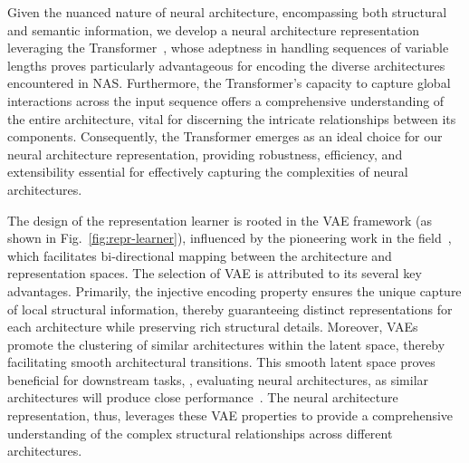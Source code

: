 \documentclass[../main.tex]{subfiles}
\begin{document}
Given the nuanced nature of neural architecture, encompassing both structural and semantic information, we develop a neural architecture representation leveraging the Transformer~\cite{DBLP:conf/nips/VaswaniSPUJGKP17,DBLP:conf/cvpr/YiZH0023}, whose adeptness in handling sequences of variable lengths proves particularly advantageous for encoding the diverse architectures encountered in NAS\@.
Furthermore, the Transformer's capacity to capture global interactions across the input sequence offers a comprehensive understanding of the entire architecture, vital for discerning the intricate relationships between its components.
Consequently, the Transformer emerges as an ideal choice for our neural architecture representation, providing robustness, efficiency, and extensibility essential for effectively capturing the complexities of neural architectures.

The design of the representation learner is rooted in the VAE framework (as shown in Fig.~\ref{fig:repr-learner}), influenced by the pioneering work in the field~\cite{DBLP:conf/nips/YanZAZ020,DBLP:conf/ijcnn/LukasikFZHK21}, which facilitates bi-directional mapping between the architecture and representation spaces.
The selection of VAE is attributed to its several key advantages.
Primarily, the injective encoding property ensures the unique capture of local structural information, thereby guaranteeing distinct representations for each architecture while preserving rich structural details.
Moreover, VAEs promote the clustering of similar architectures within the latent space, thereby facilitating smooth architectural transitions.
This smooth latent space proves beneficial for downstream tasks, \eg, evaluating neural architectures, as similar architectures will produce close performance~\cite{Liu2020ASO}.
The neural architecture representation, thus, leverages these VAE properties to provide a comprehensive understanding of the complex structural relationships across different architectures.
\end{document}
